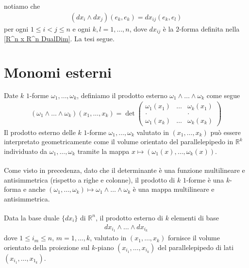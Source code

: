 \documentclass[oneside, 11pt]{amsbook}
\makeatletter
\newcommand{\0}{{(0)}}
\newcommand{\3}{{(3)}}
\theoremstyle{colonplain}
\theoremstyle{colondefinition}
\theoremstyle{colonremark}
\numberwithin{equation}{chapter}
\renewcommand{\proofname}{Dimostrazione}
\renewenvironment{proof}[1][\proofname]{\par
  \pushQED{\qed}%
  \normalfont \topsep6\p@\@plus6\p@\relax
  \trivlist
  \item[\hskip\labelsep\bfseries #1:]\ignorespaces
}{%
  \popQED\endtrivlist\@endpefalse
}
\makeatother
\begin{document}
\begin{proof} notiamo che 
\begin{align}
    (dx_i \wedge dx_j)(e_k, e_k) = dx_{ij}(e_k, e_l) 
\end{align}
per ogni $1 \leq i < j \leq n$ e ogni $k, l = 1, \dots, n$, dove $dx_{ij}$ è la $2$-forma definita nella \ref{R^n x R^n DualDim}. La tesi segue. \end{proof}

\section{Monomi esterni}
Date $k$ $1$-forme $\omega_1, \dots, \omega_k$, definiamo il prodotto esterno $\omega_1 \wedge \dots \wedge \omega_k$ come segue
\begin{align}
    (\omega_1 \wedge \dots \wedge \omega_k)(x_1, \dots, x_k) = \det
    \begin{pmatrix}
        \omega_1(x_1) & \dots & \omega_k(x_1) \\
        . & & . \\
        \omega_1(x_k) & \dots & \omega_k(x_k)
    \end{pmatrix} 
\end{align}
Il prodotto esterno delle $k$ $1$-forme $\omega_1, \dots, \omega_k$ valutato in $(x_1, \dots, x_k)$ può essere interpretato geometricamente come il volume orientato del parallelepipedo in $\mathbb{R}^k$ individuato da $\omega_1, \dots, \omega_k$ tramite la mappa $x \mapsto (\omega_1(x), \dots, \omega_k(x))$. \\ \\
Come visto in precedenza, dato che il determinante è una funzione multilineare e antisimmetrica (rispetto a righe e colonne), il prodotto di $k$ $1$-forme è una $k$-forma e anche $(\omega_1, \dots, \omega_k) \mapsto \omega_1 \wedge \dots \wedge \omega_k$ è una mappa multilineare e antisimmetrica. \\ \\
Data la base duale $\{dx_i\}$ di $\mathbb{R}^n$, il prodotto esterno di $k$ elementi di base 
\begin{align}
    dx_{i_1} \wedge \dots \wedge dx_{i_k} 
\end{align}
dove $1 \leq i_m \leq n$, $m = 1, \dots, k$,  valutato in $(x_1, \dots, x_k)$ fornisce il volume orientato della proiezione sul $k$-piano $(x_{i_1}, \dots, x_{i_k})$ del parallelepipedo di lati $(x_{i_1}, \dots, x_{1_k})$. \\ \\
\end{document}
